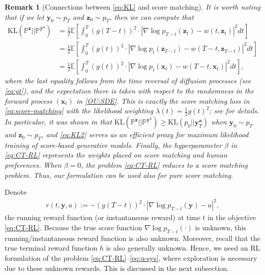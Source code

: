 \documentclass[11pt]{article}
\newtheorem{remark}{Remark}
\begin{document}
\begin{remark}[Connections between \eqref{eq:KL} and score matching]
	It is worth noting that if we let $\mathbf{y}_{0}\sim{p}_{T}$ and $\mathbf{z}_{0}\sim{p}_{T}$, then we can compute that
	\begin{align}\label{eq:KL2}
		\text{KL} (\mathbb{P}^{\mathbf{z}}|| \mathbb{P}^{\mathbf{y}^{\mathbf{a}}} ) &= \frac{1}{2} \mathbb{E} \left[ \int_0^T (g(T-t))^{2} \cdot{| \nabla\log p_{T-t}({\mathbf{z}}_{t}) - w(t, \mathbf{z}_t) |^2} dt \right] \nonumber \\
		&= \frac{1}{2} \mathbb{E} \left[ \int_0^T (g(t))^{2} \cdot{| \nabla\log p_{t}({\mathbf{z}}_{T-t}) - w(T-t, \mathbf{z}_{T-t}) |^2} dt \right] \nonumber \\
		&= \frac{1}{2} \mathbb{E} \left[ \int_0^T (g(t))^{2} \cdot{| \nabla\log p_{t}({\mathbf{x}}_{t}) - w(T-t, \mathbf{x}_{t}) |^2} dt \right],
	\end{align}
	where the last equality follows from the time reversal of diffusion processes (see \eqref{eq:yt}), and the expectation there is taken with respect to the randomness in the forward process $({\mathbf{x}}_{t})$ in
	\eqref{OU:SDE}. This is exactly the score matching loss in \eqref{eq:score-matching} with the likelihood weighting $\lambda(t) = \frac{1}{2}g(t)^2$;  see \cite{song2021maximum} for details. In particular, it was shown in \cite{song2021maximum} that $\text{KL} (\mathbb{P}^{\mathbf{z}}|| \mathbb{P}^{\mathbf{y}^{\mathbf{a}}} ) \ge \text{KL} (p_0 || \mathbf{y}^{\mathbf{a}}_{T})$ when $\mathbf{y}_0 \sim p_T$ and
	$\mathbf{z}_{0}\sim{p}_{T}$, and \eqref{eq:KL2}  serves as an efficient proxy for maximum likelihood training of score-based generative models.
	Finally, the hyperparameter $\beta$ in \eqref{eq:CT-RL} represents the weights placed on score matching and human preferences. When $\beta=0$, the problem \eqref{eq:CT-RL}
	reduces to a score matching problem. Thus, our formulation can be used also for pure score matching.
\end{remark}


Denote
\begin{align}\label{eq:rt}
 r(t, \mathbf{y}, a) := -(g(T-t))^{2} \cdot {| \nabla\log p_{T-t}({\mathbf{y}}) - a|^2},
\end{align}
 the  running reward function (or instantaneous reward) at time $t$ in the objective \eqref{eq:CT-RL}. Because the true score function $\nabla\log p_{T-t}(\cdot)$ is unknown, this running/instantaneous reward function is also unknown. Moreover, recall that the true terminal reward function $h$ is also generally unknown.
Hence, we need an RL formulation of the problem \eqref{eq:CT-RL}--\eqref{eq:u-sys}, where exploration is necessary due to these unknown rewards. This is discussed in the next subsection.
\end{document}
